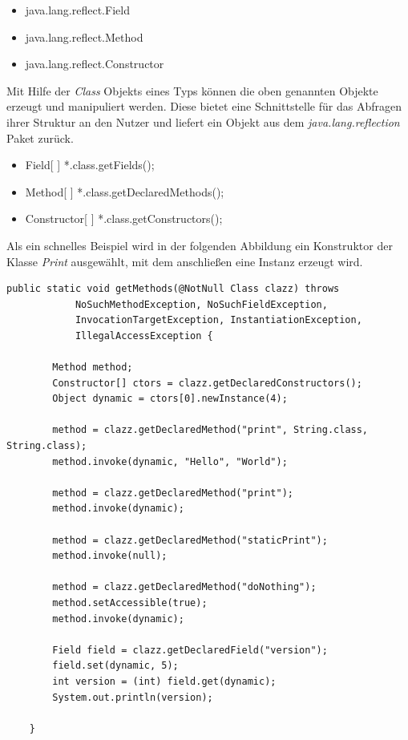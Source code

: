 \begin{itemize}
\item java.lang.reflect.Field
\item java.lang.reflect.Method
\item java.lang.reflect.Constructor
\end{itemize}
Mit Hilfe der \textit{Class} Objekts eines Typs können die oben genannten Objekte erzeugt und manipuliert werden. Diese bietet eine Schnittstelle für das Abfragen ihrer Struktur an den Nutzer und liefert ein Objekt aus dem \textit{java.lang.reflection} Paket zurück.
\begin{itemize}
\item Field[ ] *.class.getFields();
\item Method[ ] *.class.getDeclaredMethods();
\item Constructor[ ] *.class.getConstructors();
\end{itemize}

Als ein schnelles Beispiel wird in der folgenden Abbildung ein Konstruktor der Klasse \textit{Print} ausgewählt, mit dem anschließen eine Instanz erzeugt wird. \newline
\newpage 
\begin{lstlisting}[caption={Create Instance with Reflection},captionpos=b]
    public static void getMethods(@NotNull Class clazz) throws
            NoSuchMethodException, NoSuchFieldException,
            InvocationTargetException, InstantiationException,
            IllegalAccessException {

        Method method;
        Constructor[] ctors = clazz.getDeclaredConstructors();
        Object dynamic = ctors[0].newInstance(4);

        method = clazz.getDeclaredMethod("print", String.class, String.class);
        method.invoke(dynamic, "Hello", "World");

        method = clazz.getDeclaredMethod("print");
        method.invoke(dynamic);

        method = clazz.getDeclaredMethod("staticPrint");
        method.invoke(null);

        method = clazz.getDeclaredMethod("doNothing");
        method.setAccessible(true);
        method.invoke(dynamic);

        Field field = clazz.getDeclaredField("version");
        field.set(dynamic, 5);
        int version = (int) field.get(dynamic);
        System.out.println(version);

    }
\end{lstlisting}

